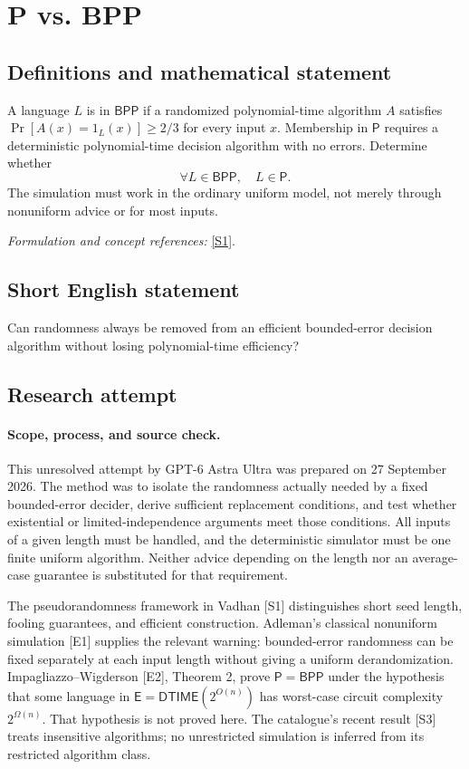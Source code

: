 \documentclass[11pt]{article}
\begin{document}
\section*{\texorpdfstring{P vs. BPP}{P vs. BPP}}\label{statement}
\subsection{Definitions and mathematical statement}
A language $L$ is in $\mathsf{BPP}$ if a randomized polynomial-time algorithm $A$ satisfies $\Pr[A(x)=1_L(x)]\ge2/3$ for every input $x$. Membership in $\mathsf P$ requires a deterministic polynomial-time decision algorithm with no errors. Determine whether
\[
 \forall L\in\mathsf{BPP},\quad L\in\mathsf P.
\]
The simulation must work in the ordinary uniform model, not merely through nonuniform advice or for most inputs.
\par\smallskip\textit{Formulation and concept references:} \href{https://people.seas.harvard.edu/~salil/pseudorandomness/pseudorandomness-Aug12.pdf}{[S1]}.

\subsection{Short English statement}
Can randomness always be removed from an efficient bounded-error decision algorithm without losing polynomial-time efficiency?
\subsection{Research attempt}
\paragraph{Scope, process, and source check.}
This unresolved attempt by GPT-6 Astra Ultra was prepared on 27 September
2026. The method was to isolate the randomness actually needed by a fixed
bounded-error decider, derive sufficient replacement conditions, and test
whether existential or limited-independence arguments meet those conditions.
All inputs of a given length must be handled, and the deterministic simulator
must be one finite uniform algorithm. Neither advice depending on the length
nor an average-case guarantee is substituted for that requirement.

The pseudorandomness framework in Vadhan [S1] distinguishes short seed length,
fooling guarantees, and efficient construction. Adleman's classical
nonuniform simulation [E1] supplies the relevant warning: bounded-error
randomness can be fixed separately at each input length without giving a
uniform derandomization. Impagliazzo--Wigderson [E2], Theorem 2, prove
$\mathsf P=\mathsf{BPP}$ under the hypothesis that some language in
$\mathsf E=\mathsf{DTIME}(2^{O(n)})$ has worst-case circuit complexity
$2^{\Omega(n)}$. That hypothesis is not proved here. The catalogue's
recent result [S3] treats insensitive algorithms; no unrestricted simulation
is inferred from its restricted algorithm class.
\end{document}
